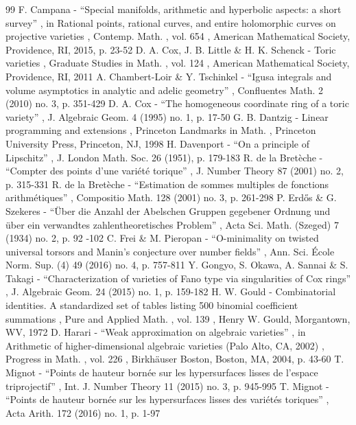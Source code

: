 \documentclass[11pt]{article}
\numberwithin{equation}{section}
\theoremstyle{definition}
\numberwithin{theorem}{section}
\begin{document}
\begin{thebibliography}{99}
 F. Campana - “Special manifolds, arithmetic and hyperbolic aspects: a short survey” , in Rational points, rational curves, and entire holomorphic curves on projective varieties , Contemp. Math. , vol. 654 , American Mathematical Society, Providence, RI, 2015, p. 23-52
 D. A. Cox, J. B. Little \& H. K. Schenck - Toric varieties , Graduate Studies in Math. , vol. 124 , American Mathematical Society, Providence, RI, 2011
 A. Chambert-Loir \& Y. Tschinkel - “Igusa integrals and volume asymptotics in analytic and adelic geometry” , Confluentes Math. 2 (2010) no. 3, p. 351-429
 D. A. Cox - “The homogeneous coordinate ring of a toric variety” , J. Algebraic Geom. 4 (1995) no. 1, p. 17-50
 G. B. Dantzig - Linear programming and extensions , Princeton Landmarks in Math. , Princeton University Press, Princeton, NJ, 1998
 H. Davenport - “On a principle of Lipschitz” , J. London Math. Soc. 26 (1951), p. 179-183
 R. de la Bretèche - “Compter des points d’une variété torique” , J. Number Theory 87 (2001) no. 2, p. 315-331
 R. de la Bretèche - “Estimation de sommes multiples de fonctions arithmétiques” , Compositio Math. 128 (2001) no. 3, p. 261-298
 P. Erdős \& G. Szekeres - “Über die Anzahl der Abelschen Gruppen gegebener Ordnung und über ein verwandtes zahlentheoretisches Problem” , Acta Sci. Math. (Szeged) 7 (1934) no. 2, p. 92 -102
 C. Frei \& M. Pieropan - “O-minimality on twisted universal torsors and Manin’s conjecture over number fields” , Ann. Sci. École Norm. Sup. (4) 49 (2016) no. 4, p. 757-811
 Y. Gongyo, S. Okawa, A. Sannai \& S. Takagi - “Characterization of varieties of Fano type via singularities of Cox rings” , J. Algebraic Geom. 24 (2015) no. 1, p. 159-182
 H. W. Gould - Combinatorial identities. A standardized set of tables listing 500 binomial coefficient summations , Pure and Applied Math. , vol. 139 , Henry W. Gould, Morgantown, WV, 1972
 D. Harari - “Weak approximation on algebraic varieties” , in Arithmetic of higher-dimensional algebraic varieties (Palo Alto, CA, 2002) , Progress in Math. , vol. 226 , Birkhäuser Boston, Boston, MA, 2004, p. 43-60
 T. Mignot - “Points de hauteur bornée sur les hypersurfaces lisses de l’espace triprojectif” , Int. J. Number Theory 11 (2015) no. 3, p. 945-995
 T. Mignot - “Points de hauteur bornée sur les hypersurfaces lisses des variétés toriques” , Acta Arith. 172 (2016) no. 1, p. 1-97

\end{thebibliography}
\end{document}
